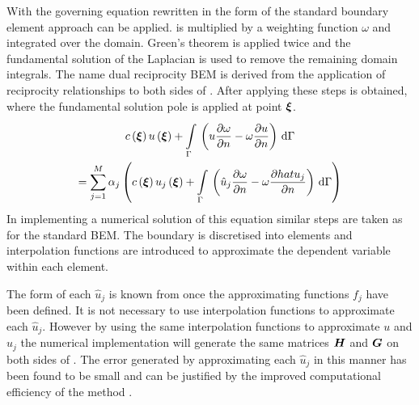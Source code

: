 With the governing equation rewritten in the form of  the
standard boundary element approach can be applied.  is
multiplied by a weighting function $\omega$ and integrated over the domain.
Green's theorem is applied twice and the fundamental solution of the
Laplacian is used to remove the remaining domain integrals. The name dual
reciprocity BEM is derived from the application of reciprocity
relationships to both sides of . After applying these
steps  is obtained, where the fundamental solution pole
is applied at point $\vect{\xi}$.
\begin{multline}
  \fnof{c}{\vect{\xi}} \fnof{u}{\vect{\xi}} + \goneint{\pbrac{u
    \delby{\omega}{n} - \omega \delby{u}{n}}}{\Gamma} \\ =
  \dsuml{j=1}{M} \alpha_{j} \pbrac{\fnof{c}{\vect{\xi}}
    \fnof{u_{j}}{\vect{\xi}} + \goneint{\pbrac{\hat{u}_{j}
      \delby{\omega}{n} - \omega \delby{hat{u}_{j}}{n}}}{\Gamma}}
\label{eq:drmmaths}
\end{multline}
In implementing a 
numerical solution of this equation similar steps are taken as for 
the standard BEM.  The boundary is
discretised into elements and interpolation functions are introduced to
approximate the dependent variable within each element. 

The form of each $\hat{u}_{j}$ is known from  once the
approximating functions $f_{j}$ have been defined. It is not necessary to
use interpolation functions to approximate each $\hat{u}_{j}$. However by
using the same interpolation functions to approximate $u$ and $\hat{u}_{j}$
the numerical implementation will generate the same matrices $\matr{H}$ and
$\matr{G}$ on both sides of . The error generated by
approximating each $\hat{u}_{j}$ in this manner has been found to be small
and can be justified by the improved computational efficiency of the method
\citep{partridge:1992}.

